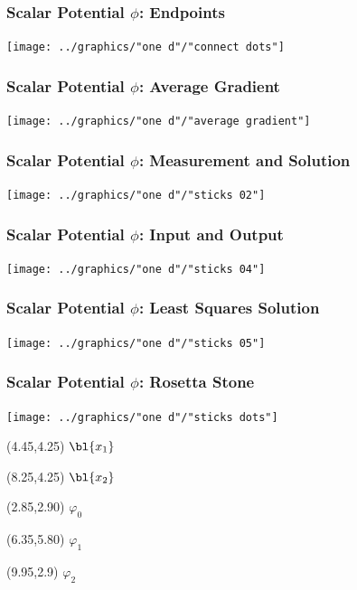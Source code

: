 \documentclass[]{beamer}
\begin{document}
\begin{frame}      %
\frametitle{Scalar Potential $\phi$: Endpoints}
  \begin{center}
    \texttt{[image: ../graphics/"one d"/"connect dots"]}
  \end{center}
\end{frame}

\begin{frame}      %
\frametitle{Scalar Potential $\phi$: Average Gradient}
  \begin{center}
    \texttt{[image: ../graphics/"one d"/"average gradient"]}
  \end{center}
\end{frame}

\begin{frame}      %
\frametitle{Scalar Potential $\phi$: Measurement and Solution}
  \begin{center}
    \texttt{[image: ../graphics/"one d"/"sticks 02"]}
  \end{center}
\end{frame}

\begin{frame}      %
\frametitle{Scalar Potential $\phi$: Input and Output}
  \begin{center}
    \texttt{[image: ../graphics/"one d"/"sticks 04"]}
  \end{center}
\end{frame}

\begin{frame}      %
\frametitle{Scalar Potential $\phi$: Least Squares Solution}
  \begin{center}
    \texttt{[image: ../graphics/"one d"/"sticks 05"]}
  \end{center}
\end{frame}

\begin{frame}      %
\frametitle{Scalar Potential $\phi$: Rosetta Stone}
  \begin{center}
    \texttt{[image: ../graphics/"one d"/"sticks dots"]}
  \end{center}
  \begin{textblock}{2.75}(4.45,4.25)
    $\bl{x_{1}}$
  \end{textblock}
  \begin{textblock}{2.75}(8.25,4.25)
    $\bl{x_{2}}$
  \end{textblock}
  \begin{textblock}{2.75}(2.85,2.90)
    $\varphi_{0}$
  \end{textblock}
  \begin{textblock}{2.75}(6.35,5.80)
    $\varphi_{1}$
  \end{textblock}
  \begin{textblock}{2.75}(9.95,2.9)
    $\varphi_{2}$
  \end{textblock}
\end{frame}
\end{document}
